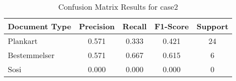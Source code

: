 \begin{table}[h]
\centering
\begin{tabular}{l|cccc}
\hline
Document Type & Precision & Recall & F1-Score & Support \\
\hline
Plankart & 0.571 & 0.333 & 0.421 & 24 \\
Bestemmelser & 0.571 & 0.667 & 0.615 & 6 \\
Sosi & 0.000 & 0.000 & 0.000 & 0 \\
\hline
\end{tabular}
\caption{Confusion Matrix Results for case2}
\end{table}
